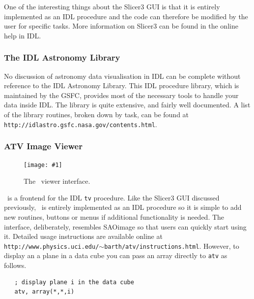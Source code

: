 \documentclass[twoside,11pt]{article}
\newcommand{\htmladdnormallink}[2]{#1}
\newcommand{\htmladdimg}[1]{}
\newcommand{\latex}[1]{#1}
\newcommand{\myfig} [5] {
  \begin{figure}[thb]
    \centering\texttt{[image: \#1]}
    \typeout{#1 inserted on page \arabic{page}}
    \caption{\label{#4}#5}
  \end{figure}
  }
\newcommand{\myfig}[5]{
    \label{#4} \htmladdimg{#3}\\
    Figure: #5\\
    }
\begin{document}
{One of the interesting things about the Slicer3 GUI is that it is
entirely implemented as an IDL \htmladdnormallink{procedure}{
http://www.astro.washington.edu/deutsch-bin/getpro/library07.html?SLICER3}
and the code can therefore be modified by the user for specific tasks.
More information on Slicer3 can be found in the online help in IDL.

\subsubsection{The IDL Astronomy Library}

No discussion of astronomy data visualisation in IDL can be complete
without reference to the \htmladdnormallink{IDL Astronomy
Library}{http://idlastro.gsfc.nasa.gov/}.  This IDL procedure library,
which is maintained by the GSFC, provides most of the necessary tools
to handle your data inside IDL.  The library is quite extensive, and
fairly well
\htmladdnormallink{documented}{http://idlastro.gsfc.nasa.gov/contents.html}.\latex{
A list of the library routines, broken down by task, can be found at
{\tt http://idlastro.gsfc.nasa.gov/contents.html}.}

\subsubsection{ATV Image Viewer}

\myfig{sc16_atv.eps}{height=0.5\textheight}{sc16_atv.gif}{sc16_atv_fig}{The
\ATV\ viewer interface.} 

\htmladdnormallink{\ATV}{http://www.physics.uci.edu/~barth/atv/}
\normalsize\  is a
frontend for the IDL {\tt tv} procedure.  Like the Slicer3 GUI
discussed previously, \ATV\ is entirely implemented as an IDL
\htmladdnormallink{procedure}{http://www.physics.uci.edu/~barth/atv/atv.pro}
so it is simple to add new routines, buttons or menus if additional
functionality is needed.  The interface, deliberately, resembles
SAOimage so that users can quickly start using it.  Detailed usage
\htmladdnormallink{instructions}{http://www.physics.uci.edu/~barth/atv/instructions.html}
are available online\latex{ at {\tt
http://www.physics.uci.edu/$\sim$barth/atv/instructions.html}}.  However,
to display an a plane in a data cube you can pass an array directly to
{\tt atv} as follows.

\small\begin{verbatim}
   ; display plane i in the data cube
   atv, array(*,*,i)
\end{verbatim}\normalsize

}
\end{document}
